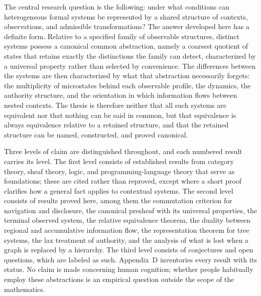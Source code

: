 The central research question is the following: under what conditions can heterogeneous formal systems be represented by a shared structure of contexts, observations, and admissible transformations? The answer developed here has a definite form. Relative to a specified family of observable structures, distinct systems possess a canonical common abstraction, namely a coarsest quotient of states that retains exactly the distinctions the family can detect, characterized by a universal property rather than selected by convenience. The differences between the systems are then characterized by what that abstraction necessarily forgets: the multiplicity of microstates behind each observable profile, the dynamics, the authority structure, and the orientation in which information flows between nested contexts. The thesis is therefore neither that all such systems are equivalent nor that nothing can be said in common, but that equivalence is always equivalence relative to a retained structure, and that the retained structure can be named, constructed, and proved canonical.

Three levels of claim are distinguished throughout, and each numbered result carries its level. The first level consists of established results from category theory, sheaf theory, logic, and programming-language theory that serve as foundations; these are cited rather than reproved, except where a short proof clarifies how a general fact applies to contextual systems. The second level consists of results proved here, among them the commutation criterion for navigation and disclosure, the canonical presheaf with its universal properties, the terminal observed system, the relative equivalence theorem, the duality between regional and accumulative information flow, the representation theorem for tree systems, the lax treatment of authority, and the analysis of what is lost when a graph is replaced by a hierarchy. The third level consists of conjectures and open questions, which are labeled as such. Appendix~D inventories every result with its status. No claim is made concerning human cognition; whether people habitually employ these abstractions is an empirical question outside the scope of the mathematics.

